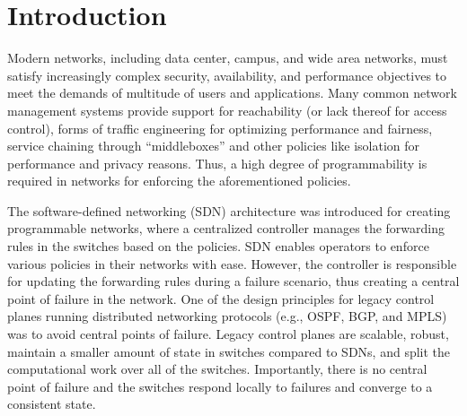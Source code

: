 \section{Introduction}
Modern networks, including data center, campus, 
and wide area networks, 
must satisfy increasingly complex security, 
availability, and performance objectives to 
meet the demands of multitude of users and applications. 
Many common network management systems provide support
for reachability (or lack thereof for access control),
forms of traffic engineering for optimizing performance
and fairness, service chaining through ``middleboxes'' and
other policies like isolation for performance and privacy reasons.
Thus, a high degree of programmability is required in networks
for enforcing the aforementioned policies.

The software-defined networking (SDN) architecture was introduced
for creating programmable networks, where a centralized controller
manages the forwarding rules in the switches based on the policies.
SDN enables operators to enforce various policies in their networks 
with ease. 
However, the controller is responsible for updating the forwarding
rules during a failure scenario, thus creating a central point of 
failure in the network. One of the design principles
for legacy control planes running distributed networking protocols 
(e.g., OSPF, BGP, and MPLS) was to avoid central points of failure.
Legacy control planes are scalable, robust, maintain a smaller amount 
of state in switches compared to SDNs, 
and split the computational work over all of the switches. 
Importantly, there is no central point of failure and the switches
respond locally to failures and converge to a consistent state. 

